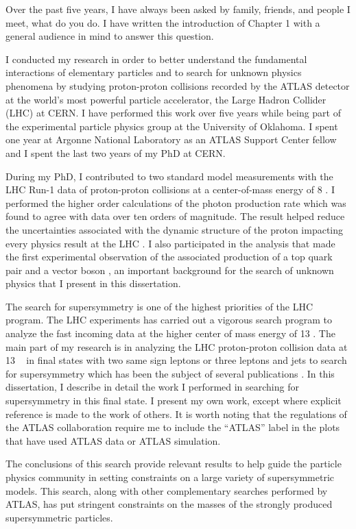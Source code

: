 Over the past five years, 
I have always been asked by family, friends, 
and people I meet, what do you do.
I have written the introduction of Chapter 1 with a general audience in mind to answer this
question.

I conducted  my research in order to  better understand the fundamental interactions of elementary particles 
and to search for unknown physics phenomena by studying proton-proton collisions recorded by the ATLAS detector at the world's
most powerful particle accelerator, the Large Hadron Collider (LHC) at CERN.
I have performed this work over five years while being part of the  experimental particle physics group at the University of Oklahoma.
I spent one year at Argonne National Laboratory as an ATLAS Support Center fellow and I spent the last two years of my PhD at CERN. 

During my PhD, I contributed to two standard model measurements with the LHC Run-1 data of proton-proton collisions at 
a center-of-mass energy of 8 \TeV.
I performed the higher order calculations of the photon production rate which was found to agree with data over ten orders of 
magnitude. The result helped reduce the uncertainties associated with the dynamic structure of the proton impacting
every physics result at the LHC \cite{paper-2015-Photon}.
I also participated in the analysis that made the first experimental observation of the  associated production of a top quark pair
and a vector boson \cite{paper-2015-ttV}, an important background for the search of unknown physics that I present in this dissertation.

The search for supersymmetry is one of the highest priorities of the 
LHC program. The LHC experiments has carried out a 
vigorous search program to analyze the fast incoming data at the higher 
center of mass energy of 13 \TeV. 
The main part of my research is in analyzing the LHC proton-proton collision data at 13 \TeV~
in final states with two same sign leptons or three leptons and jets to search for supersymmetry
which has been the subject of several publications \cite{Aaboud:2017dmy,conf-2016-SS3L,paper-2015-SS3L,conf-2015-SS3L}. 
In this dissertation, I describe in detail the work I performed in searching for supersymmetry in this final state.
I present my own work, except where explicit reference is made to the work of others.
It is worth noting that the regulations of the ATLAS collaboration require me to include 
the ``ATLAS'' label in the plots that have used ATLAS data or ATLAS simulation. 


The conclusions of this search provide relevant results to help guide the particle physics 
community in setting constraints on a large variety of supersymmetric models. 
This search, along with other complementary searches performed by ATLAS, has
put stringent constraints on the masses of the strongly produced 
supersymmetric particles.


